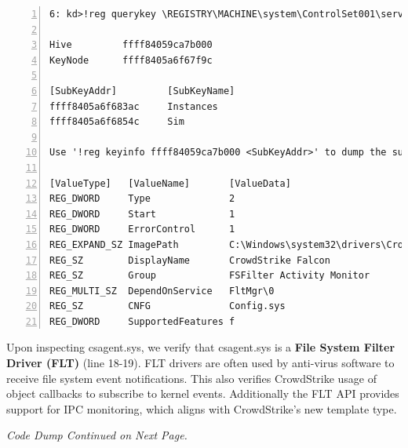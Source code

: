 \begin{lstlisting}[caption=Inspecting csagent.sys, numbers=left]
6: kd>!reg querykey \REGISTRY\MACHINE\system\ControlSet001\services\csagent

Hive         ffff84059ca7b000
KeyNode      ffff8405a6f67f9c
    
[SubKeyAddr]         [SubKeyName]
ffff8405a6f683ac     Instances
ffff8405a6f6854c     Sim
    
Use '!reg keyinfo ffff84059ca7b000 <SubKeyAddr>' to dump the subkey details
    
[ValueType]   [ValueName]       [ValueData]
REG_DWORD     Type              2
REG_DWORD     Start             1
REG_DWORD     ErrorControl      1
REG_EXPAND_SZ ImagePath         C:\Windows\system32\drivers\CrowdStrike\csagent.sys
REG_SZ        DisplayName       CrowdStrike Falcon
REG_SZ        Group             FSFilter Activity Monitor
REG_MULTI_SZ  DependOnService   FltMgr\0
REG_SZ        CNFG              Config.sys
REG_DWORD     SupportedFeatures f
\end{lstlisting}

\vspace{2em}

\noindent
Upon inspecting csagent.sys, we verify that csagent.sys is a \textbf{File System Filter Driver (FLT)} (line 18-19).
FLT drivers are often used by anti-virus software to receive file system event notifications.
This also verifies CrowdStrike usage of object callbacks to subscribe to kernel events. Additionally
the FLT API provides support for IPC monitoring, which aligns with CrowdStrike's new template type.

\vfill 
\begin{center}
    \textit{Code Dump Continued on Next Page.}
\end{center}
\vfill

\newpage


